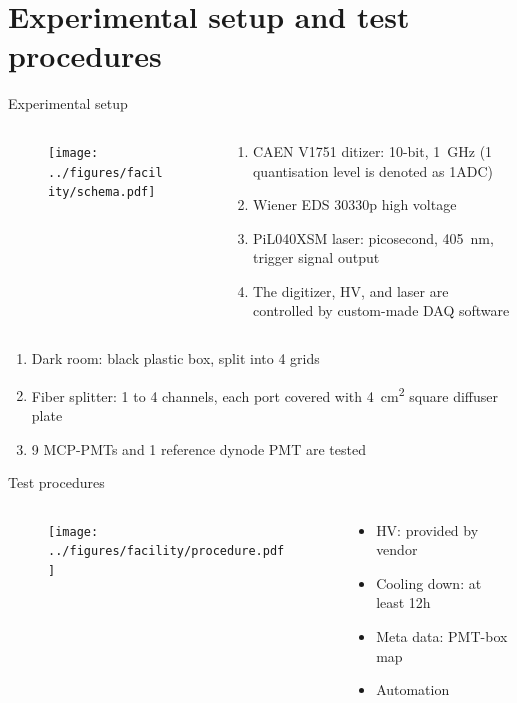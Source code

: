 \documentclass[aspectratio=169]{beamer}
\begin{document}
\section{Experimental setup and test procedures}
\begin{frame}{Experimental setup}
    \begin{columns}
        \begin{column}{0.4\textwidth}
            \begin{figure}
                \texttt{[image: ../figures/facility/schema.pdf]}
            \end{figure}
        \end{column}
        \begin{column}{0.6\textwidth}
            \begin{enumerate}
                \item CAEN V1751 ditizer: 10-bit, \SI{1}{GHz} (1 quantisation level is denoted as 1ADC)
                \item Wiener EDS 30330p high voltage
                \item PiL040XSM laser: picosecond, \SI{405}{nm}, trigger signal output
                \item The digitizer, HV, and laser are controlled by custom-made DAQ software
            \end{enumerate}
        \end{column}
    \end{columns}
    \begin{enumerate}
        \item Dark room: black plastic box, split into 4 grids
        \item Fiber splitter: 1 to 4 channels, each port covered with \SI{4}{cm\tothe{2}} square diffuser plate
        \item 9 MCP-PMTs and 1 reference dynode PMT are tested
    \end{enumerate}
\end{frame}

\begin{frame}{Test procedures}
    \begin{columns}
        \begin{column}{0.4\textwidth}
            \begin{figure}
                \texttt{[image: ../figures/facility/procedure.pdf]}
            \end{figure}
        \end{column}
        \begin{column}{0.6\textwidth}
            \begin{itemize}
                \item HV: provided by vendor
                \item Cooling down: at least 12h
                \item Meta data: PMT-box map
                \item Automation
            \end{itemize}
        \end{column}
    \end{columns}
\end{frame}
\end{document}
